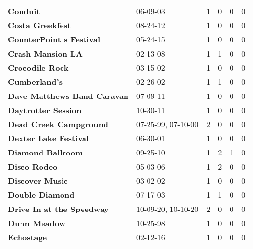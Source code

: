 \begin{supertabular}{p{0.4\textwidth}p{0.3\textwidth}p{0.05\textwidth}p{0.05\textwidth}p{0.05\textwidth}p{0.05\textwidth}}
                                                     \textbf{Conduit} &            06-09-03 &  1 &  0 &  0 &  0 \\
                                             \textbf{Costa Greekfest} &            08-24-12 &  1 &  0 &  0 &  0 \\
                                     \textbf{CounterPoint s Festival} &            05-24-15 &  1 &  0 &  0 &  0 \\
                                            \textbf{Crash Mansion LA} &            02-13-08 &  1 &  1 &  0 &  0 \\
                                              \textbf{Crocodile Rock} &            03-15-02 &  1 &  0 &  0 &  0 \\
                                                \textbf{Cumberland's} &            02-26-02 &  1 &  1 &  0 &  0 \\
                                  \textbf{Dave Matthews Band Caravan} &            07-09-11 &  1 &  0 &  0 &  0 \\
                                          \textbf{Daytrotter Session} &            10-30-11 &  1 &  0 &  0 &  0 \\
                                       \textbf{Dead Creek Campground} &  07-25-99, 07-10-00 &  2 &  0 &  0 &  0 \\
                                        \textbf{Dexter Lake Festival} &            06-30-01 &  1 &  0 &  0 &  0 \\
                                            \textbf{Diamond Ballroom} &            09-25-10 &  1 &  2 &  1 &  0 \\
                                                 \textbf{Disco Rodeo} &            05-03-06 &  1 &  2 &  0 &  0 \\
                                              \textbf{Discover Music} &            03-02-02 &  1 &  0 &  0 &  0 \\
                                              \textbf{Double Diamond} &            07-17-03 &  1 &  1 &  0 &  0 \\
                                    \textbf{Drive In at the Speedway} &  10-09-20, 10-10-20 &  2 &  0 &  0 &  0 \\
                                                 \textbf{Dunn Meadow} &            10-25-98 &  1 &  0 &  0 &  0 \\
                                                   \textbf{Echostage} &            02-12-16 &  1 &  0 &  0 &  0 \\

\end{supertabular}
